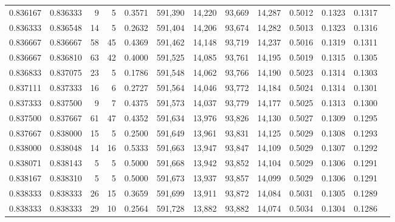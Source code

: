 \begin{tabular}{rrrrrrrrrrrrr}
0.836167 & 0.836333 &     9 &   5 &                                     0.3571 & 591,390 &  14,220 &  93,669 &  14,287 & 0.5012 & 0.1323 & 0.1317 \\
0.836333 & 0.836548 &    14 &   5 &                                     0.2632 & 591,404 &  14,206 &  93,674 &  14,282 & 0.5013 & 0.1323 & 0.1316 \\
0.836667 & 0.836667 &    58 &  45 &                                     0.4369 & 591,462 &  14,148 &  93,719 &  14,237 & 0.5016 & 0.1319 & 0.1311 \\
0.836667 & 0.836810 &    63 &  42 &                                     0.4000 & 591,525 &  14,085 &  93,761 &  14,195 & 0.5019 & 0.1315 & 0.1305 \\
0.836833 & 0.837075 &    23 &   5 &                                     0.1786 & 591,548 &  14,062 &  93,766 &  14,190 & 0.5023 & 0.1314 & 0.1303 \\
0.837111 & 0.837333 &    16 &   6 &                                     0.2727 & 591,564 &  14,046 &  93,772 &  14,184 & 0.5024 & 0.1314 & 0.1301 \\
0.837333 & 0.837500 &     9 &   7 &                                     0.4375 & 591,573 &  14,037 &  93,779 &  14,177 & 0.5025 & 0.1313 & 0.1300 \\
0.837500 & 0.837667 &    61 &  47 &                                     0.4352 & 591,634 &  13,976 &  93,826 &  14,130 & 0.5027 & 0.1309 & 0.1295 \\
0.837667 & 0.838000 &    15 &   5 &                                     0.2500 & 591,649 &  13,961 &  93,831 &  14,125 & 0.5029 & 0.1308 & 0.1293 \\
0.838000 & 0.838048 &    14 &  16 &                                     0.5333 & 591,663 &  13,947 &  93,847 &  14,109 & 0.5029 & 0.1307 & 0.1292 \\
0.838071 & 0.838143 &     5 &   5 &                                     0.5000 & 591,668 &  13,942 &  93,852 &  14,104 & 0.5029 & 0.1306 & 0.1291 \\
0.838167 & 0.838310 &     5 &   5 &                                     0.5000 & 591,673 &  13,937 &  93,857 &  14,099 & 0.5029 & 0.1306 & 0.1291 \\
0.838333 & 0.838333 &    26 &  15 &                                     0.3659 & 591,699 &  13,911 &  93,872 &  14,084 & 0.5031 & 0.1305 & 0.1289 \\
0.838333 & 0.838333 &    29 &  10 &                                     0.2564 & 591,728 &  13,882 &  93,882 &  14,074 & 0.5034 & 0.1304 & 0.1286 \\

\end{tabular}
